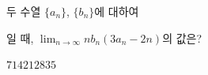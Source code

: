 두 수열 $\{a_n\}$, $\{b_n\}$에 대하여 \par\smallskip{}\par\smallskip\noindent 일 때, $\displaystyle\lim_{n\to\infty}nb_n(3a_n-2n)$의 값은?
\begin{choices32}{$7$}{$14$}{$21$}{$28$}{$35$}\end{choices32}
